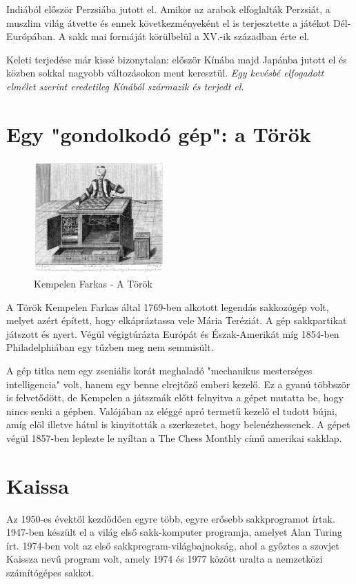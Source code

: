 \documentclass[twoside, a4paper, 12pt]{book}
\begin{document}
Indiából először Perzsiába jutott el. Amikor az arabok elfoglalták Perzsiát, a muszlim világ átvette és ennek következményeként el is terjesztette a játékot Dél-Európában. A sakk mai formáját körülbelül a XV.-ik században érte el.

Keleti terjedése már kissé bizonytalan: először Kínába majd Japánba jutott el és közben sokkal nagyobb változásokon ment keresztül.
\textit{Egy kevésbé elfogadott elmélet szerint eredetileg Kínából származik és terjedt el.}\cite{HistoryOfChessHu}\cite{HistoryOfChessEn}

\section{Egy "gondolkodó gép": a Török}
\begin{figure}
	\caption{Kempelen Farkas - A Török}
	\label{fig:the_turk}
	\includegraphics[width=5.0cm]{img/the_turk}
\end{figure}
A Török Kempelen Farkas által 1769-ben alkotott legendás sakkozógép volt, melyet azért épített, hogy elkápráztassa vele Mária Teréziát. A gép sakkpartikat játszott és nyert. Végül végigtúrázta Európát és Észak-Amerikát míg 1854-ben Philadelphiában egy tűzben meg nem semmisült. 

A gép titka nem egy zseniális korát meghaladó "mechanikus mesterséges intelligencia" volt, hanem egy benne elrejtőző emberi kezelő. Ez a gyanú többször is felvetődött, de Kempelen a játszmák előtt felnyitva a gépet mutatta be, hogy nincs senki a gépben. Valójában az eléggé apró termetű kezelő el tudott bújni, amíg elöl illetve hátul is kinyitották a szerkezetet, hogy belenézhessenek. A gépet végül 1857-ben leplezte le nyíltan a The Chess Monthly című amerikai sakklap.\cite{MechanicalTurkHu}\cite{MechanicalTurkEn}\cite{CsodakKonyveHu}

\section{Kaissa}
Az 1950-es évektől kezdődően egyre több, egyre erősebb sakkprogramot írtak. 1947-ben készült el a világ első sakk-komputer programja, amelyet Alan Turing írt. 1974-ben volt az első sakkprogram-világbajnokság, ahol a győztes a szovjet Kaissza nevű program volt, amely 1974 és 1977 között uralta a nemzetközi számítógépes sakkot.\cite{chessProgramsHu}
\end{document}

